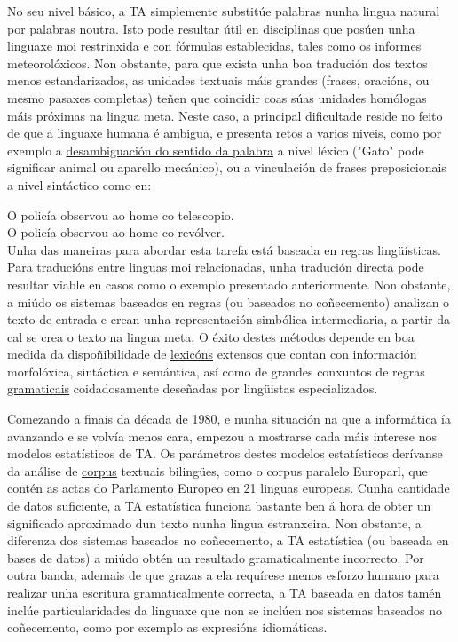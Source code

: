 \begin{multicols}{2}
No seu nivel básico, a TA simplemente substitúe palabras nunha lingua natural por palabras noutra. Isto pode resultar útil en disciplinas que posúen unha linguaxe moi restrinxida e con fórmulas establecidas, tales como os informes meteorolóxicos. Non obstante, para que exista unha boa tradución dos textos menos estandarizados, as unidades textuais máis grandes (frases, oracións, ou mesmo pasaxes completas) teñen que coincidir coas súas unidades homólogas máis próximas na lingua meta. Neste caso, a principal dificultade reside no feito de que a linguaxe humana é ambigua, e presenta retos a varios niveis, como por exemplo a \uline{desambiguación do sentido da palabra} a nivel léxico ("Gato" pode significar animal ou aparello mecánico), ou a vinculación de frases preposicionais a nivel sintáctico como en:

\hspace{10pt}O policía observou ao home co telescopio.\\
 \hspace{10pt}O policía observou ao home co revólver.\\

Unha das maneiras para abordar esta tarefa está baseada en regras lingüísticas. Para traducións entre linguas moi relacionadas, unha tradución directa pode resultar viable en casos como o exemplo presentado anteriormente. Non obstante, a miúdo os sistemas baseados en regras (ou baseados no coñecemento) analizan o texto de entrada e crean unha representación simbólica intermediaria, a partir da cal se crea o texto na lingua meta. O éxito destes métodos depende en boa medida da dispoñibilidade de \uline{lexicóns} extensos que contan con información morfolóxica, sintáctica e semántica, así como de grandes conxuntos de regras \uline{gramaticais} coidadosamente deseñadas por lingüistas especializados.

Comezando a finais da década de 1980, e nunha situación na que a informática ía avanzando e se volvía menos cara, empezou a mostrarse cada máis interese nos modelos estatísticos de TA. Os parámetros destes modelos estatísticos derívanse da análise de \uline{corpus} textuais bilingües, como o corpus paralelo Europarl, que contén as actas do Parlamento Europeo en 21 linguas europeas. Cunha cantidade de datos suficiente, a TA estatística funciona bastante ben á hora de obter un significado aproximado dun texto nunha lingua estranxeira. Non obstante, a diferenza dos sistemas baseados no coñecemento, a TA estatística (ou baseada en bases de datos) a miúdo obtén un resultado gramaticalmente incorrecto. Por outra banda, ademais de que grazas a ela requírese menos esforzo humano para realizar unha escritura gramaticalmente correcta, a TA baseada en datos tamén inclúe particularidades da linguaxe que non se inclúen nos sistemas baseados no coñecemento, como por exemplo as expresións idiomáticas. 


\end{multicols}

